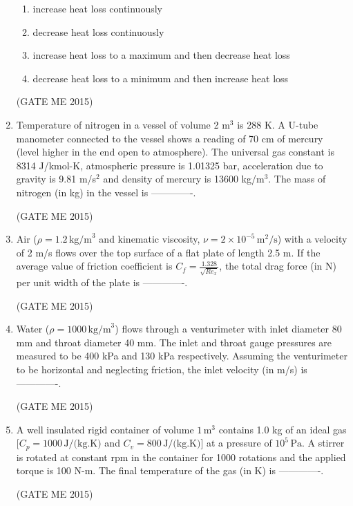 \documentclass[journal]{IEEEtran}
\begin{document}
\begin{enumerate}
\begin{enumerate}
    \item increase heat loss continuously
    \item decrease heat loss continuously
    \item increase heat loss to a maximum and then decrease heat loss
    \item decrease heat loss to a minimum and then increase heat loss
\end{enumerate}
\hfill  (GATE ME 2015)

\item Temperature of nitrogen in a vessel of volume 2 m$^3$ is 288 K. A U-tube manometer connected to the vessel shows a reading of 70 cm of mercury (level higher in the end open to atmosphere). The universal gas constant is 8314 J/kmol-K, atmospheric pressure is 1.01325 bar, acceleration due to gravity is 9.81 m/s$^2$ and density of mercury is 13600 kg/m$^3$. The mass of nitrogen (in kg) in the vessel is -------------.

\hfill  (GATE ME 2015)

\item Air ($\rho = 1.2 \, \text{kg/m}^3$ and kinematic viscosity, $\nu = 2 \times 10^{-5} \, \text{m}^2/\text{s}$) with a velocity of 2 m/s flows over the top surface of a flat plate of length 2.5 m. If the average value of friction coefficient is $C_f = \frac{1.328}{\sqrt{Re_x}}$, the total drag force (in N) per unit width of the plate is -------------.

\hfill  (GATE ME 2015)

\item Water ($\rho = 1000 \, \text{kg/m}^3$) flows through a venturimeter with inlet diameter 80 mm and throat diameter 40 mm. The inlet and throat gauge pressures are measured to be 400 kPa and 130 kPa respectively. Assuming the venturimeter to be horizontal and neglecting friction, the inlet velocity (in m/s) is -------------.

\hfill  (GATE ME 2015)

\item A well insulated rigid container of volume $1 \, \text{m}^3$ contains 1.0 kg of an ideal gas [$C_p = 1000 \, \text{J/(kg.K)}$ and $C_v = 800 \, \text{J/(kg.K)}$] at a pressure of $10^5 \, \text{Pa}$. A stirrer is rotated at constant rpm in the container for 1000 rotations and the applied torque is 100 N-m. The final temperature of the gas (in K) is -------------.

\hfill  (GATE ME 2015)


\end{enumerate}
\end{document}
